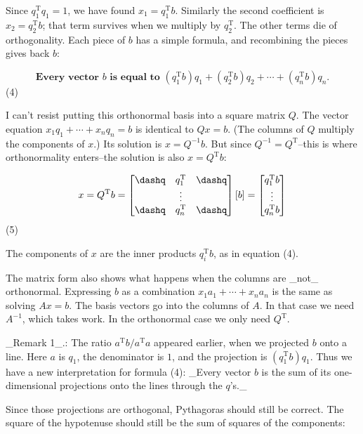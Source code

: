 Since \(q_{1}^{\mathrm{T}}q_{1}=1\), we have found \(x_{1}=q_{1}^{\mathrm{T}}b\). Similarly the second coefficient is \(x_{2}=q_{2}^{\mathrm{T}}b\); that term survives when we multiply by \(q_{2}^{\mathrm{T}}\). The other terms die of orthogonality. Each piece of \(b\) has a simple formula, and recombining the pieces gives back \(b\):

\[\textbf{{Every vector }}b\textbf{{ is equal to }}(q_{1}^{\mathrm{T}}b)q_{1}+(q_{2}^{ \mathrm{T}}b)q_{2}+\cdots+(q_{n}^{\mathrm{T}}b)q_{n}.\] (4)

I can't resist putting this orthonormal basis into a square matrix \(Q\). The vector equation \(x_{1}q_{1}+\cdots+x_{n}q_{n}=b\) is identical to \(Qx=b\). (The columns of \(Q\) multiply the components of \(x\).) Its solution is \(x=Q^{-1}b\). But since \(Q^{-1}=Q^{\mathrm{T}}\)--this is where orthonormality enters--the solution is also \(x=Q^{\mathrm{T}}b\):

\[x=Q^{\mathrm{T}}b=\begin{bmatrix}\dashq&q_{1}^{\mathrm{T}}&\dashq\\ &\vdots&\\ \dashq&q_{n}^{\mathrm{T}}&\dashq\end{bmatrix}\left[b\right]=\begin{bmatrix}q_ {1}^{\mathrm{T}}b\\ \vdots\\ q_{n}^{\mathrm{T}}b\end{bmatrix}\] (5)

The components of \(x\) are the inner products \(q_{i}^{\mathrm{T}}b\), as in equation (4).

The matrix form also shows what happens when the columns are _not_ orthonormal. Expressing \(b\) as a combination \(x_{1}a_{1}+\cdots+x_{n}a_{n}\) is the same as solving \(Ax=b\). The basis vectors go into the columns of \(A\). In that case we need \(A^{-1}\), which takes work. In the orthonormal case we only need \(Q^{\mathrm{T}}\).

_Remark 1_.: The ratio \(a^{\mathrm{T}}b/a^{\mathrm{T}}a\) appeared earlier, when we projected \(b\) onto a line. Here \(a\) is \(q_{1}\), the denominator is \(1\), and the projection is \((q_{1}^{\mathrm{T}}b)q_{1}\). Thus we have a new interpretation for formula (4): _Every vector \(b\) is the sum of its one-dimensional projections onto the lines through the \(q\)'s._

Since those projections are orthogonal, Pythagoras should still be correct. The square of the hypotenuse should still be the sum of squares of the components:

